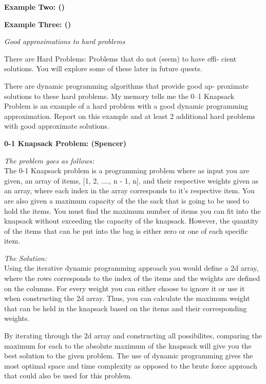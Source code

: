 \documentclass{article}
\begin{document}
\bigskip

\noindent \textbf{Example Two: ()}

\bigskip

\noindent \textbf{Example Three: ()}




\pagebreak

\noindent \textit{Good approximations to hard problems}

\medskip

There are Hard Problems: Problems that do not (seem) to have effi-
cient solutions. You will explore some of these later in future quests.

\medskip

There are dynamic programming algorithms that provide good ap-
proximate solutions to these hard problems. My memory tells me the
0–1 Knapsack Problem is an example of a hard problem with a good
dynamic programming approximation. Report on this example and
at least 2 additional hard problems with good approximate solutions.

\bigskip

\noindent \textbf{0-1 Knapsack Problem: (Spencer)} 

\noindent \textit{The problem goes as follows:} \\
The 0-1 Knapsack problem is a programming problem where as input you
are given, an array of items, [1, 2, ...., n - 1, n], and their 
respective weights given as an array, where each index in the array
corresponds to it's respective item. You are also given a maximum capacity
of the the sack that is going to be used to hold the items. You must find
the maximum number of items you can fit into the knapsack without exceeding
the capacity of the knapsack. However, the quantity of the items that can
be put into the bag is either zero or one of each specific item.

\medskip

\noindent \textit{The Solution:} \\
Using the iterative dynamic programming approach you would define a 2d array,
where the rows corresponds to the index of the items and the weights are defined
on the columns. For every weight you can either choose to ignore it or use it
when constructing the 2d array. Thus, you can calculate the maximum weight
that can be held in the knapsack based on the items and their corresponding
weights.

By iterating through the 2d array and constructing all possibilites, comparing
the maximum for each to the absolute maximum of the knapsack will give you 
the best solution to the given problem. The use of dynamic programming gives
the most optimal space and time complexity as opposed to the brute force
approach that could also be used for this problem.
\end{document}
